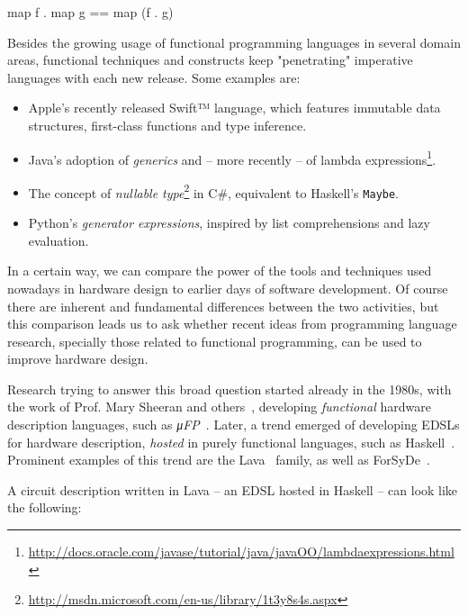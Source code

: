     {\centering
        \begin{haskellcode}
            map f . map g == map (f . g)
        \end{haskellcode}
    }

    Besides the growing usage of functional programming languages in several domain areas,
    functional techniques and constructs keep "penetrating" imperative languages
    with each new release. Some examples are:

    \begin{itemize}
        \item Apple's recently released Swift™ language, which features immutable data structures,
            first-class functions and type inference.
        \item Java's adoption of \emph{generics} and – more recently – of lambda
            expressions\footnote{\url{http://docs.oracle.com/javase/tutorial/java/javaOO/lambdaexpressions.html}}.
        \item The concept of \emph{nullable type}\footnote{\url{http://msdn.microsoft.com/en-us/library/1t3y8s4s.aspx}}
            in C\#, equivalent to Haskell's \texttt{Maybe}.
        \item Python's \emph{generator expressions}, inspired by list comprehensions and lazy evaluation.
    \end{itemize}

    In a certain way, we can compare the power of the tools and techniques
    used nowadays in hardware design to earlier days of software development.
    Of course there are inherent and fundamental differences between the two activities, but
    this comparison leads us to ask whether recent ideas from programming language research,
    specially those related to functional programming, can be used to improve hardware design.

    Research trying to answer this broad question started already in the 1980s,
    with the work of Prof. Mary Sheeran and others~\cite{sheeran-survey},
    developing \emph{functional} hardware description languages, such as \emph{μFP}~\cite{mufp-1984}.
    Later, a trend emerged of developing \acp{EDSL} for hardware description,
    \emph{hosted} in purely functional languages, such as Haskell~\cite{haskell2010}.
    Prominent examples of this trend are the Lava~\cite{lava-1999} family,
    as well as ForSyDe~\cite{forsyde1999}.

    A circuit description written in Lava – an \ac{EDSL} hosted in Haskell – can look like the following:

